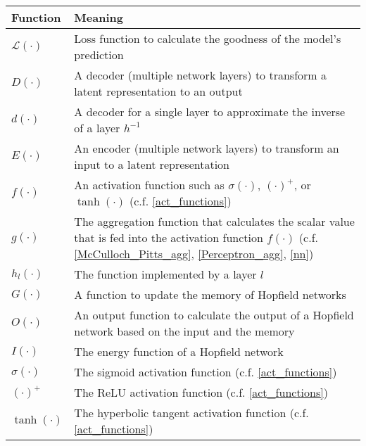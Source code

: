 \begin{tabular}{ p{3cm} p{11cm} }
	\textbf{Function} & \textbf{Meaning}\\
	\hline
	$\mathcal{L}(\cdot)$ & Loss function to calculate the goodness of the model's prediction\\
	$D(\cdot)$ & A decoder (multiple network layers) to transform a latent representation to an output\\
	$d(\cdot)$ & A decoder for a single layer to approximate the inverse of a layer $h^{-1}$\\
	$E(\cdot)$ & An encoder (multiple network layers) to transform an input to a latent representation\\
	$f(\cdot)$ & An activation function such as $\sigma(\cdot)$, $(\cdot)^{+}$, or $\tanh(\cdot)$ (c.f. \eqref{act_functions})\\
	$g(\cdot)$ & The aggregation function that calculates the scalar value that is fed into the activation function $f(\cdot)$ (c.f. \eqref{McCulloch_Pitts_agg}, \eqref{Perceptron_agg}, \eqref{nn})\\
	$h_l(\cdot)$ & The function implemented by a layer $l$\\
	$G(\cdot)$ & A function to update the memory of Hopfield networks\\
	$O(\cdot)$ & An output function to calculate the output of a Hopfield network based on the input and the memory\\
	$I(\cdot)$ & The energy function of a Hopfield network\\
	$\sigma(\cdot)$ & The sigmoid activation function (c.f. \eqref{act_functions})\\
	$(\cdot)^{+}$ & The ReLU activation function (c.f. \eqref{act_functions})\\
	 $\tanh(\cdot)$ & The hyperbolic tangent activation function (c.f. \eqref{act_functions})\\
	
\end{tabular}
